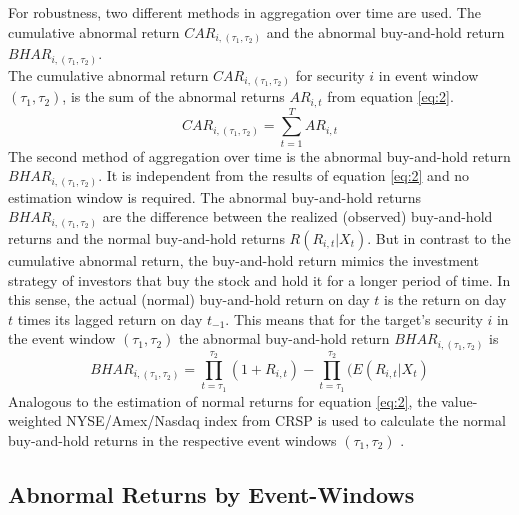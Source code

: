 \documentclass[12pt]{article}
\begin{document}
For robustness, two different methods in aggregation over time are used. The cumulative abnormal return $CAR_{i,(\tau_1,\tau_2)}$ and the abnormal buy-and-hold return $BHAR_{i,(\tau_1,\tau_2)}$.\\
The cumulative abnormal return $CAR_{i,(\tau_1,\tau_2)}$ for security $i$ in event window $(\tau_1,\tau_2)$, is the sum of the abnormal returns $AR_{i,t}$ from equation \eqref{eq:2}.
	\begin{equation}
		CAR_{i,(\tau_1,\tau_2)}=\sum_{t=1}^{T}AR_{i,t}
	\end{equation}
The second method of aggregation over time is the abnormal buy-and-hold return $BHAR_{i,(\tau_1,\tau_2)}$. It is independent from the results of equation \eqref{eq:2} and no estimation window is required. 
The abnormal buy-and-hold returns $BHAR_{i,(\tau_1,\tau_2)}$ are the difference between the realized (observed) buy-and-hold returns and the normal buy-and-hold returns $R(R_{i,t}|X_{t})$.
But in contrast to the cumulative abnormal return, the buy-and-hold return mimics the investment strategy of investors that buy the stock and hold it for a longer period of time. In this sense, the actual (normal) buy-and-hold return on day $t$ is the return on day $t$ times its lagged return on day $t_{-1}$. This means that for the target's security $i$ in the event window $(\tau_1,\tau_2)$ the abnormal buy-and-hold return $BHAR_{i,(\tau_1,\tau_2)}$ is
\begin{equation}
	BHAR_{i,(\tau_1,\tau_2)}=\prod_{t=\tau_1}^{\tau_2}(1+R_{i,t})-\prod_{t=\tau_1}^{\tau_2}(E(R_{i,t}|X_{t})
\end{equation}
Analogous to the estimation of normal returns for equation \eqref{eq:2}, the value-weighted NYSE/Amex/Nasdaq index from CRSP is used to calculate the normal buy-and-hold returns in the respective event windows $(\tau_1,\tau_2)$ \citep[p.25]{Brav2009}.

\subsection{Abnormal Returns by Event-Windows}
\end{document}
